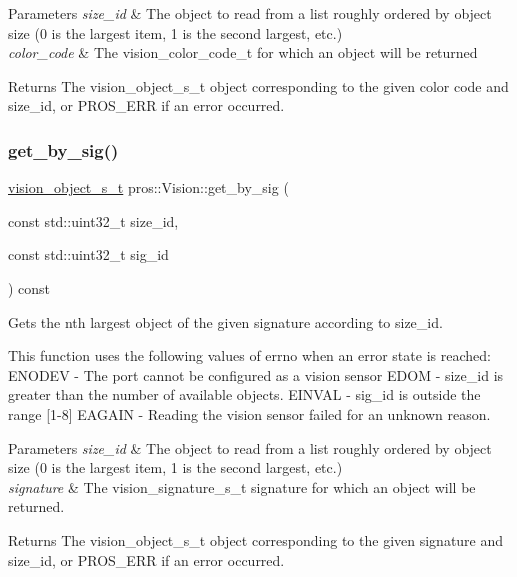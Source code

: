 \begin{DoxyParams}{Parameters}
{\em size\+\_\+id} & The object to read from a list roughly ordered by object size (0 is the largest item, 1 is the second largest, etc.) \\
\hline
{\em color\+\_\+code} & The vision\+\_\+color\+\_\+code\+\_\+t for which an object will be returned\\
\hline
\end{DoxyParams}
\begin{DoxyReturn}{Returns}
The vision\+\_\+object\+\_\+s\+\_\+t object corresponding to the given color code and size\+\_\+id, or P\+R\+O\+S\+\_\+\+E\+RR if an error occurred. 
\end{DoxyReturn}
\mbox{\label{classpros_1_1Vision_a10fd89ed3c5e8fe5ce25046a877c7d84}} 
\subsubsection{\texorpdfstring{get\+\_\+by\+\_\+sig()}{get\_by\_sig()}}
{\footnotesize\ttfamily \hyperlink{vision_8h_ae619120558539c13e53b5a6f42fb4375}{vision\+\_\+object\+\_\+s\+\_\+t} pros\+::\+Vision\+::get\+\_\+by\+\_\+sig (\begin{DoxyParamCaption}\item[{const std\+::uint32\+\_\+t}]{size\+\_\+id,  }\item[{const std\+::uint32\+\_\+t}]{sig\+\_\+id }\end{DoxyParamCaption}) const}

Gets the nth largest object of the given signature according to size\+\_\+id.

This function uses the following values of errno when an error state is reached\+: E\+N\+O\+D\+EV -\/ The port cannot be configured as a vision sensor E\+D\+OM -\/ size\+\_\+id is greater than the number of available objects. E\+I\+N\+V\+AL -\/ sig\+\_\+id is outside the range \mbox{[}1-\/8\mbox{]} E\+A\+G\+A\+IN -\/ Reading the vision sensor failed for an unknown reason.


\begin{DoxyParams}{Parameters}
{\em size\+\_\+id} & The object to read from a list roughly ordered by object size (0 is the largest item, 1 is the second largest, etc.) \\
\hline
{\em signature} & The vision\+\_\+signature\+\_\+s\+\_\+t signature for which an object will be returned.\\
\hline
\end{DoxyParams}
\begin{DoxyReturn}{Returns}
The vision\+\_\+object\+\_\+s\+\_\+t object corresponding to the given signature and size\+\_\+id, or P\+R\+O\+S\+\_\+\+E\+RR if an error occurred. 
\end{DoxyReturn}
\mbox{\label{classpros_1_1Vision_aa5cca450a5b80278a97bbea786195733}} 
